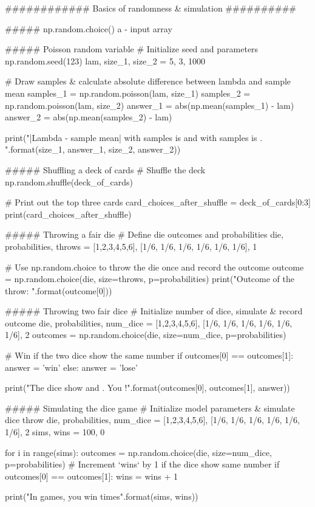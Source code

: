 ############  Basics of randomness & simulation  ##########

##### np.random.choice()    
a - input array

##### Poisson random variable
# Initialize seed and parameters
np.random.seed(123) 
lam, size_1, size_2 = 5, 3, 1000  

# Draw samples & calculate absolute difference between lambda and sample mean
samples_1 = np.random.poisson(lam, size_1)
samples_2 = np.random.poisson(lam, size_2)
answer_1 = abs(np.mean(samples_1) - lam)
answer_2 = abs(np.mean(samples_2) - lam)

print("|Lambda - sample mean| with {} samples is {} and with {} samples is {}. ".format(size_1, answer_1, size_2, answer_2))

##### Shuffling a deck of cards
# Shuffle the deck
np.random.shuffle(deck_of_cards)

# Print out the top three cards
card_choices_after_shuffle = deck_of_cards[0:3]
print(card_choices_after_shuffle)

##### Throwing a fair die
# Define die outcomes and probabilities
die, probabilities, throws = [1,2,3,4,5,6], [1/6, 1/6, 1/6, 1/6, 1/6, 1/6], 1

# Use np.random.choice to throw the die once and record the outcome
outcome = np.random.choice(die, size=throws, p=probabilities)
print("Outcome of the throw: {}".format(outcome[0]))

##### Throwing two fair dice
# Initialize number of dice, simulate & record outcome
die, probabilities, num_dice = [1,2,3,4,5,6], [1/6, 1/6, 1/6, 1/6, 1/6, 1/6], 2
outcomes = np.random.choice(die, size=num_dice, p=probabilities) 

# Win if the two dice show the same number
if outcomes[0] == outcomes[1]: 
    answer = 'win' 
else:
    answer = 'lose'

print("The dice show {} and {}. You {}!".format(outcomes[0], outcomes[1], answer))

##### Simulating the dice game
# Initialize model parameters & simulate dice throw
die, probabilities, num_dice = [1,2,3,4,5,6], [1/6, 1/6, 1/6, 1/6, 1/6, 1/6], 2
sims, wins = 100, 0

for i in range(sims):
    outcomes = np.random.choice(die, size=num_dice, p=probabilities)  
    # Increment `wins` by 1 if the dice show same number
    if outcomes[0] == outcomes[1]: 
        wins = wins + 1 

print("In {} games, you win {} times".format(sims, wins))

